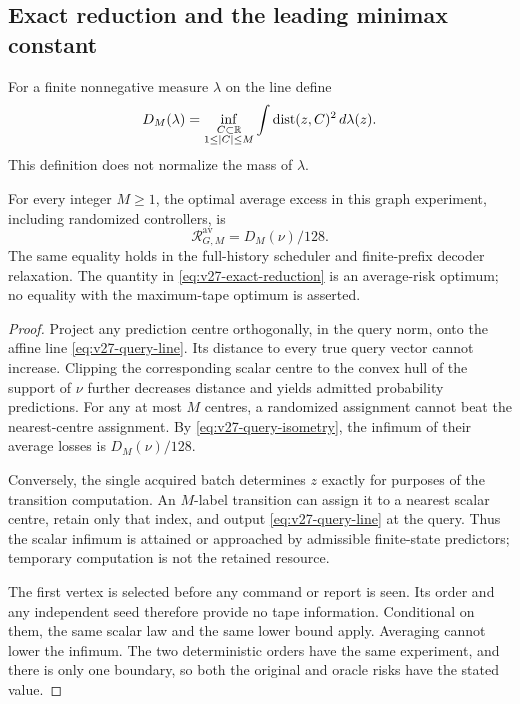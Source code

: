 \subsection{Exact reduction and the leading minimax constant}
For a finite nonnegative measure $\lambda$ on the line define
\[
 D_M(\lambda)=\inf_{\substack{C\subset\mathbb R\\1\le|C|\le M}}
                    \int\operatorname{dist}(z,C)^2\,d\lambda(z).
\]
This definition does not normalize the mass of $\lambda$.

\begin{proposition}
\label{prop:v27-exact-reduction}
For every integer $M\ge1$, the optimal average excess in this graph experiment, including randomized controllers, is
\begin{equation}\label{eq:v27-exact-reduction}
                   \mathcal R^{\mathrm{av}}_{G,M}=D_M(\nu)/128.
\end{equation}
The same equality holds in the full-history scheduler and finite-prefix decoder relaxation. The quantity in \eqref{eq:v27-exact-reduction} is an average-risk optimum; no equality with the maximum-tape optimum is asserted.
\end{proposition}
\begin{proof}
Project any prediction centre orthogonally, in the query norm, onto the affine line \eqref{eq:v27-query-line}. Its distance to every true query vector cannot increase. Clipping the corresponding scalar centre to the convex hull of the support of $\nu$ further decreases distance and yields admitted probability predictions. For any at most $M$ centres, a randomized assignment cannot beat the nearest-centre assignment. By \eqref{eq:v27-query-isometry}, the infimum of their average losses is $D_M(\nu)/128$.

Conversely, the single acquired batch determines $z$ exactly for purposes of the transition computation. An $M$-label transition can assign it to a nearest scalar centre, retain only that index, and output \eqref{eq:v27-query-line} at the query. Thus the scalar infimum is attained or approached by admissible finite-state predictors; temporary computation is not the retained resource.

The first vertex is selected before any command or report is seen. Its order and any independent seed therefore provide no tape information. Conditional on them, the same scalar law and the same lower bound apply. Averaging cannot lower the infimum. The two deterministic orders have the same experiment, and there is only one boundary, so both the original and oracle risks have the stated value.
\end{proof}

